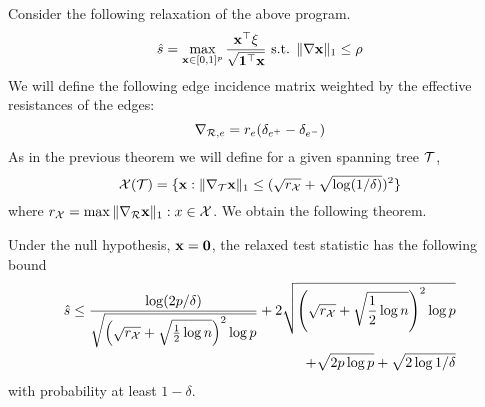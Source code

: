 Consider the following relaxation of the above program.
\[
\hat s = \max_{\mathbf{x} \in [0,1]^p} \frac{\mathbf{x}^\top \xi}{\sqrt{{\bf 1}^\top \mathbf{x}}} \textrm{ s.t. } \| \nabla \mathbf{x} \|_1 \le \rho
\]
We will define the following edge incidence matrix weighted by the effective resistances of the edges:
\[
\nabla_{\mathcal{R},e} = r_e (\delta_{e^+} - \delta_{e^-})
\]
As in the previous theorem we will define for a given spanning tree ${\mathcal{T}}$,
\[
\mathcal{X}({\mathcal{T}}) = \{ \mathbf{x} : \| \nabla_{\mathcal{T}} \mathbf{x} \|_1 \le (\sqrt{r_{\mathcal{X}}} + \sqrt{\log (1 / \delta)})^2 \}
\]
where $r_{\mathcal{X}} = \max{\| \nabla_{\mathcal{R}}\mathbf{x}\|_1 : x \in \mathcal{X}}$.
We obtain the following theorem.
\begin{theorem}
Under the null hypothesis, $\mathbf{x} = {\bf 0}$, the relaxed test statistic has the following bound
\[
\begin{aligned}
\hat s \le \frac{\log (2p / \delta)}{\sqrt{ \left(\sqrt{r_{\mathcal{X}}} + \sqrt{\frac 12 \log n} \right)^2 \log p} } + 2 \sqrt{\left(\sqrt{r_{\mathcal{X}}} + \sqrt{\frac 12 \log n} \right)^2 \log p} \\
+ \sqrt{2 p \log p} + \sqrt{2 \log 1 / \delta}
\end{aligned}
\]
with probability at least $1 - \delta$.
\end{theorem}

